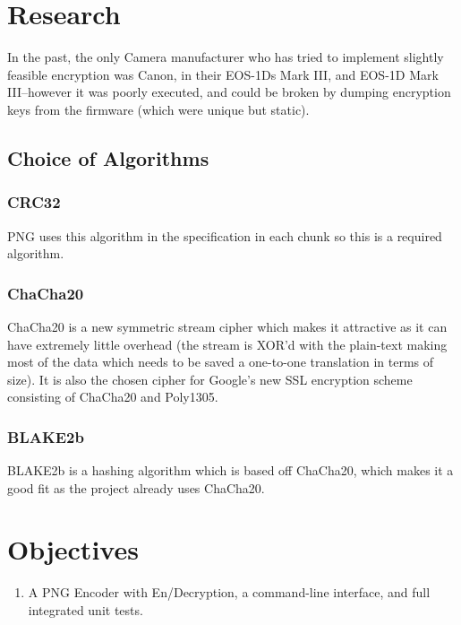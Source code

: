 \documentclass{report}
\begin{document}
\section{Research}

In the past, the only Camera manufacturer who has tried to implement slightly feasible encryption was Canon, in their EOS-1Ds Mark III, and EOS-1D Mark III\cite{canonenc}--however it was poorly executed, and could be broken by dumping encryption keys from the firmware (which were unique but static)\cite{stackoverflow}.

\subsection{Choice of Algorithms}

\subsubsection{CRC32}

PNG uses this algorithm in the specification\cite{png} in each chunk so this is a required algorithm.

\subsubsection{ChaCha20}

ChaCha20 is a new symmetric stream cipher which makes it attractive as it can have extremely little overhead (the stream is XOR'd with the plain-text making most of the data which needs to be saved a one-to-one translation in terms of size). It is also the chosen cipher for Google's new SSL encryption scheme consisting of ChaCha20 and Poly1305\cite{googlepost}.

\subsubsection{BLAKE2b}

BLAKE2b is a hashing algorithm which is based off ChaCha20, which makes it a good fit as the project already uses ChaCha20.

\section{Objectives}

\begin{enumerate}
\item A PNG Encoder with En/Decryption, a command-line interface, and full integrated unit tests.
\end{enumerate}
\end{document}

